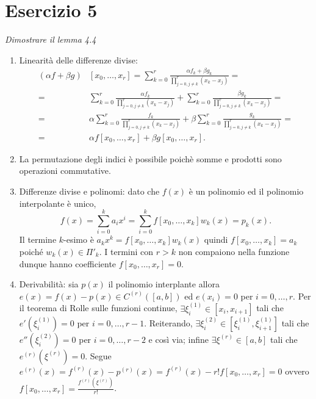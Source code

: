 \section{Esercizio 5}
\label{sub:Esercizio 5}
\emph{Dimostrare il lemma 4.4}
\begin{sol}
	\normalfont
	\begin{enumerate}
		\item Linearità delle differenze divise: \begin{equation*}\begin{split}(\alpha f+\beta g)&[x_0,\ldots,x_r]=\sum_{k=0}^r{\frac{\alpha f_k+\beta g_k}{\prod_{j=0,j\neq k}^r{(x_k-x_j)}}}=\\=&\sum_{k=0}^r{\frac{\alpha f_k}{\prod_{j=0,j\neq k}^r{(x_k-x_j)}}}+\sum_{k=0}^r{\frac{\beta g_k}{\prod_{j=0,j\neq k}^r{(x_k-x_j)}}}=\\=&\alpha\sum_{k=0}^r{\frac{f_k}{\prod_{j=0,j\neq k}^r{(x_k-x_j)}}}+\beta\sum_{k=0}^r{\frac{g_k}{\prod_{j=0,j\neq k}^r{(x_k-x_j)}}}=\\=&\alpha f[x_0,\ldots,x_r]+\beta g[x_0,\ldots,x_r].\end{split}\end{equation*}
		\item La permutazione degli indici è possibile poichè somme e prodotti sono operazioni commutative.
		\item Differenze divise e polinomi: dato che $f(x)$ è un polinomio ed il polinomio interpolante è unico, $$f(x)=\sum_{i=0}^k{a_ix^i}=\sum_{i=0}^k{f[x_0,\ldots,x_k]w_k(x)}=p_k(x).$$Il termine $k$-esimo è $a_kx^k=f[x_0,\ldots,x_k]w_k(x)$ quindi $f[x_0,\ldots,x_k]=a_k$ poiché $w_k(x)\in\Pi'_k$. I termini con $r>k$ non compaiono nella funzione dunque hanno coefficiente $f[x_0,\ldots,x_r]=0$.
		\item Derivabilità: sia $p(x)$ il polinomio interplante allora $e(x)=f(x)-p(x)\in C^{(r)}\left([a,b]\right)$ ed $e(x_i)=0$ per $i=0,\ldots,r$. Per il teorema di Rolle sulle funzioni continue, $\exists\xi^{(1)}_i\in\left[x_i,x_{i+1}\right]$ tali che $e'(\xi^{(1)}_i)=0$ per $i=0,\ldots,r-1$. Reiterando, $\exists\xi^{(2)}_i\in\left[\xi^{(1)}_i,\xi^{(1)}_{i+1}\right]$ tali che $e''(\xi^{(2)}_i)=0$ per $i=0,\ldots,r-2$ e così via; infine $\exists\xi^{(r)}\in\left[a,b\right]$ tali che $e^{(r)}(\xi^{(r)})=0$. Segue $e^{(r)}(x)=f^{(r)}(x)-p^{(r)}(x)=f^{(r)}(x)-r!f[x_0,\ldots,x_r]=0$ ovvero $f[x_0,\ldots,x_r]=\frac{f^{(r)}(\xi^{(r)})}{r!}$.

\end{enumerate}
\end{sol}
